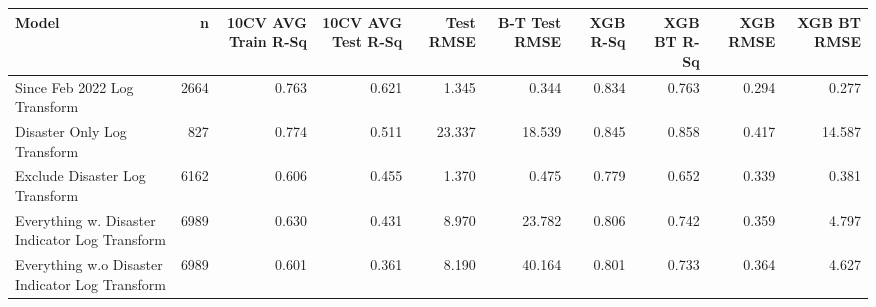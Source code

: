 
\begin{tabular}{l|r|r|r|r|r|r|r|r|r}
\hline
Model & n & 10CV AVG Train R-Sq & 10CV AVG Test R-Sq & Test RMSE & B-T Test RMSE & XGB R-Sq & XGB BT R-Sq & XGB RMSE & XGB BT RMSE\\
\hline
Since Feb 2022 Log Transform & 2664 & 0.763 & 0.621 & 1.345 & 0.344 & 0.834 & 0.763 & 0.294 & 0.277\\
\hline
Disaster Only Log Transform & 827 & 0.774 & 0.511 & 23.337 & 18.539 & 0.845 & 0.858 & 0.417 & 14.587\\
\hline
Exclude Disaster Log Transform & 6162 & 0.606 & 0.455 & 1.370 & 0.475 & 0.779 & 0.652 & 0.339 & 0.381\\
\hline
Everything w. Disaster Indicator Log Transform & 6989 & 0.630 & 0.431 & 8.970 & 23.782 & 0.806 & 0.742 & 0.359 & 4.797\\
\hline
Everything w.o Disaster Indicator Log Transform & 6989 & 0.601 & 0.361 & 8.190 & 40.164 & 0.801 & 0.733 & 0.364 & 4.627\\
\hline
\end{tabular}
